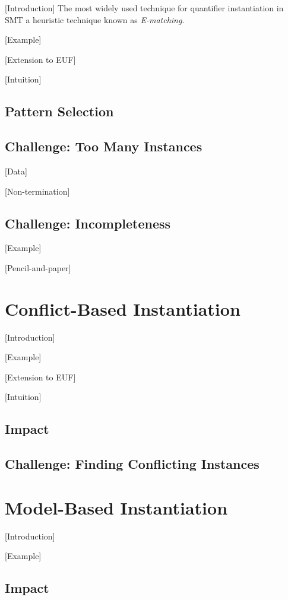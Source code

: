 \documentclass[oribibl]{llncs}
\begin{document}
[Introduction]
The most widely used technique for quantifier instantiation in SMT a heuristic technique known as \emph{E-matching}.


[Example]

[Extension to EUF]

[Intuition]

\subsection{Pattern Selection}

\subsection{Challenge: Too Many Instances}

[Data]

[Non-termination]

\subsection{Challenge: Incompleteness}

[Example]

[Pencil-and-paper]

\section{Conflict-Based Instantiation}
\label{sec:cbqi}

[Introduction]

[Example]

[Extension to EUF]

[Intuition]

\subsection{Impact}

\subsection{Challenge: Finding Conflicting Instances}

\section{Model-Based Instantiation}
\label{sec:mbqi}

[Introduction]

[Example]

\subsection{Impact}
\end{document}
